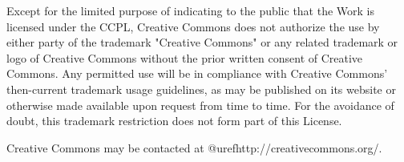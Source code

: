     Except for the limited purpose of indicating to the public that the
    Work is licensed under the CCPL, Creative Commons does not authorize
    the use by either party of the trademark "Creative Commons" or any
    related trademark or logo of Creative Commons without the prior
    written consent of Creative Commons. Any permitted use will be in
    compliance with Creative Commons' then-current trademark usage
    guidelines, as may be published on its website or otherwise made
    available upon request from time to time. For the avoidance of doubt,
    this trademark restriction does not form part of this License.

    Creative Commons may be contacted at @uref{http://creativecommons.org/}.
   
